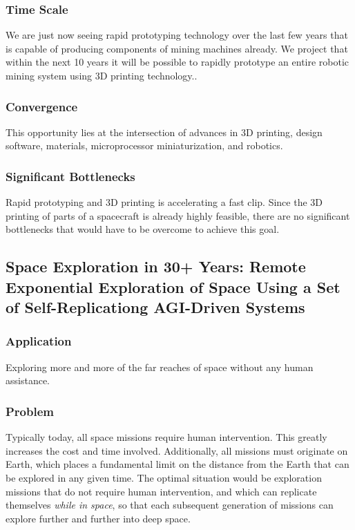\documentclass[english]{article}
\begin{document}
\subsubsection{Time Scale}

We are just now seeing rapid prototyping technology over the last
few years that is capable of producing components of mining machines
already. We project that within the next 10 years it will be possible
to rapidly prototype an entire robotic mining system using 3D printing
technology..


\subsubsection{Convergence}

This opportunity lies at the intersection of advances in 3D printing,
design software, materials, microprocessor miniaturization, and robotics.


\subsubsection{Significant Bottlenecks}

Rapid prototyping and 3D printing is accelerating a fast clip. Since
the 3D printing of parts of a spacecraft is already highly feasible,
there are no significant bottlenecks that would have to be overcome
to achieve this goal.


\subsection{Space Exploration in 30+ Years: Remote Exponential Exploration of
Space Using a Set of Self-Replicationg AGI-Driven Systems}


\subsubsection{Application}

Exploring more and more of the far reaches of space without any human
assistance.


\subsubsection{Problem}

Typically today, all space missions require human intervention. This
greatly increases the cost and time involved. Additionally, all missions
must originate on Earth, which places a fundamental limit on the distance
from the Earth that can be explored in any given time. The optimal
situation would be exploration missions that do not require human
intervention, and which can replicate themselves \emph{while in space},
so that each subsequent generation of missions can explore further
and further into deep space.
\end{document}
